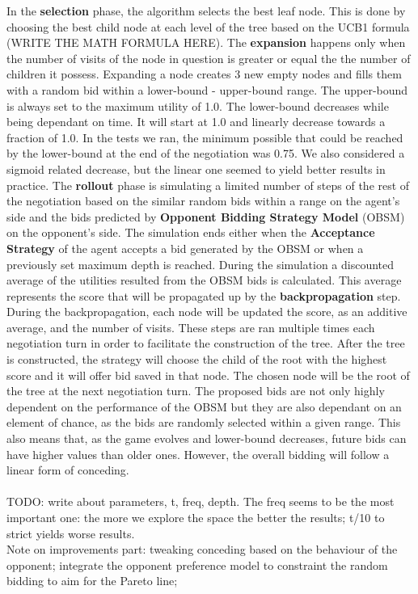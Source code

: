 \documentclass[a4paper,11pt]{article}
\theoremstyle{mytheor}
\begin{document}
In the \textbf{selection} phase, the algorithm selects the best leaf node. This is done by choosing the best child node at each level of the tree based on the UCB1 formula (WRITE THE MATH FORMULA HERE). The \textbf{expansion} happens only when the number of visits of the node in question is greater or equal the the number of children it possess. Expanding a node creates 3 new empty nodes and fills them with a random bid within a lower-bound - upper-bound range. The upper-bound is always set to the maximum utility of 1.0. The lower-bound decreases while being dependant on time. It will start at 1.0 and linearly decrease towards a fraction of 1.0. In the tests we ran, the minimum possible that could be reached by the lower-bound at the end of the negotiation was 0.75. We also considered a sigmoid related decrease, but the linear one seemed to yield better results in practice. The \textbf{rollout} phase is simulating a limited number of steps of the rest of the negotiation based on the similar random bids within a range on the agent's side and the bids predicted by \textbf{Opponent Bidding Strategy Model} (OBSM) on the opponent's side. The simulation ends either when the \textbf{Acceptance Strategy} of the agent accepts a bid generated by the OBSM or when a previously set maximum depth is reached. During the simulation a discounted average of the utilities resulted from the OBSM bids is calculated. This average represents the score that will be propagated up by the \textbf{backpropagation} step. During the backpropagation, each node will be updated the score, as an additive average, and the number of visits. These steps are ran multiple times each negotiation turn in order to facilitate the construction of the tree. After the tree is constructed, the strategy will choose the child of the root with the highest score and it will offer bid saved in that node. The chosen node will be the root of the tree at the next negotiation turn. The proposed bids are not only highly dependent on the performance of the OBSM but they are also dependant on an element of chance, as the bids are randomly selected within a given range. This also means that, as the game evolves and lower-bound decreases, future bids can have higher values than older ones. However, the overall bidding will follow a linear form of conceding. \\
\\
TODO: write about parameters, t, freq, depth. The freq seems to be the most important one: the more we explore the space the better the results; t/10 to strict yields worse results.
\\
Note on improvements part: tweaking conceding based on the behaviour of the opponent; integrate the opponent preference model to constraint the random bidding to aim for the Pareto line;
\end{document}
